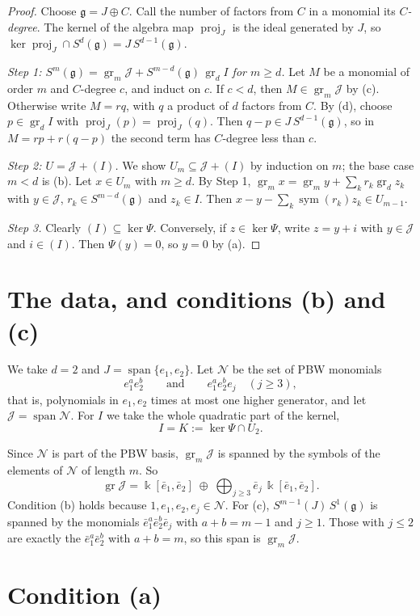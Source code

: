 \documentclass[11pt]{amsart}
\theoremstyle{definition}
\theoremstyle{remark}
\newcommand{\g}{\mathfrak{g}}
\newcommand{\U}{U}
\newcommand{\cJ}{\mathcal{J}}
\newcommand{\cN}{\mathcal{N}}
\newcommand{\gr}{\operatorname{gr}}
\newcommand{\proj}{\operatorname{proj}}
\newcommand{\sym}{\operatorname{sym}}
\newcommand{\kk}{\Bbbk}
\newcommand{\eb}{\bar e}
\begin{document}
\begin{proof}
Choose $\g=J\oplus C$. Call the number of factors from $C$ in a monomial its \emph{$C$-degree}. The kernel of the algebra map $\proj_J$ is the ideal generated by $J$, so $\ker\proj_J\cap S^d(\g)=J\,S^{d-1}(\g)$.

\emph{Step 1: $S^m(\g)=\gr_m\cJ+S^{m-d}(\g)\,\gr_dI$ for $m\ge d$.} Let $M$ be a monomial of order $m$ and $C$-degree $c$, and induct on $c$. If $c<d$, then $M\in\gr_m\cJ$ by (c). Otherwise write $M=rq$, with $q$ a product of $d$ factors from $C$. By (d), choose $p\in\gr_dI$ with $\proj_J(p)=\proj_J(q)$. Then $q-p\in J\,S^{d-1}(\g)$, so in $M=rp+r(q-p)$ the second term has $C$-degree less than $c$.

\emph{Step 2: $\U=\cJ+(I)$.} We show $\U_m\subseteq\cJ+(I)$ by induction on $m$; the base case $m<d$ is (b). Let $x\in\U_m$ with $m\ge d$. By Step 1, $\gr_mx=\gr_my+\sum_kr_k\gr_dz_k$ with $y\in\cJ$, $r_k\in S^{m-d}(\g)$ and $z_k\in I$. Then $x-y-\sum_k\sym(r_k)z_k\in\U_{m-1}$.

\emph{Step 3.} Clearly $(I)\subseteq\ker\Psi$. Conversely, if $z\in\ker\Psi$, write $z=y+i$ with $y\in\cJ$ and $i\in(I)$. Then $\Psi(y)=0$, so $y=0$ by (a).
\end{proof}

\section{The data, and conditions (b) and (c)}

We take $d=2$ and $J=\operatorname{span}\{e_1,e_2\}$. Let $\cN$ be the set of PBW monomials
\[
e_1^ae_2^b\qquad\text{and}\qquad e_1^ae_2^be_j\quad(j\ge3),
\]
that is, polynomials in $e_1,e_2$ times at most one higher generator, and let $\cJ=\operatorname{span}\cN$. For $I$ we take the whole quadratic part of the kernel,
\[
I=K:=\ker\Psi\cap\U_2 .
\]

Since $\cN$ is part of the PBW basis, $\gr_m\cJ$ is spanned by the symbols of the elements of $\cN$ of length $m$. So
\[
\gr\cJ=\kk[\eb_1,\eb_2]\;\oplus\;\textstyle\bigoplus_{j\ge3}\eb_j\,\kk[\eb_1,\eb_2].
\]
Condition (b) holds because $1,e_1,e_2,e_j\in\cN$. For (c), $S^{m-1}(J)\,S^1(\g)$ is spanned by the monomials $\eb_1^a\eb_2^b\eb_j$ with $a+b=m-1$ and $j\ge1$. Those with $j\le2$ are exactly the $\eb_1^a\eb_2^b$ with $a+b=m$, so this span is $\gr_m\cJ$.

\section{Condition (a)}
\end{document}
